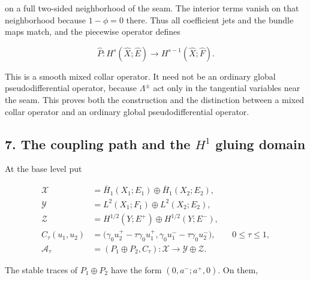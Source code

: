 \documentclass[
  11pt,
]{article}
\makeatletter
\let\ReaderOriginalAnchorStart\hyper@anchorstart
\let\ReaderOriginalAnchorEnd\hyper@anchorend
\let\ReaderPendingAliases\@empty
\def\ReaderArmAliases#1{\gdef\ReaderPendingAliases{#1}}
\def\hyper@anchorstart#1{\ReaderIfNativeAnchorTF{#1}{\ReaderPendingAliases\global\let\ReaderPendingAliases\@empty}{}\ReaderOriginalAnchorStart{#1}}
\makeatother
\begin{document}
on a full two-sided neighborhood of the seam. The interior terms vanish
on that neighborhood because \(1-\phi=0\) there. Thus all coefficient
jets and the bundle maps match, and the piecewise operator defines

\[
 \widehat P:H^s(\widehat X;\widehat E)
       \longrightarrow H^{s-1}(\widehat X;\widehat F).
 \tag{DI24}
\]

This is a smooth mixed collar operator. It need not be an ordinary
global pseudodifferential operator, because \(\Lambda^\pm\) act only in
the tangential variables near the seam. This proves both the
construction and the distinction between a mixed collar operator and an
ordinary global pseudodifferential operator.

\ReaderArmAliases{\ReaderOriginalAnchorStart{AN03-SDI-007}\ReaderOriginalAnchorEnd\begingroup\expandafter\def\csname @currentHref\endcsname{AN03-SDI-007}\label{AN03-SDI-007}\endgroup\ReaderOriginalAnchorStart{7-the-coupling-path-and-the-h-1-gluing-domain}\ReaderOriginalAnchorEnd\begingroup\expandafter\def\csname @currentHref\endcsname{7-the-coupling-path-and-the-h-1-gluing-domain}\label{7-the-coupling-path-and-the-h-1-gluing-domain}\endgroup\ReaderOriginalAnchorStart{the-coupling-path-and-the-h1-gluing-domain}\ReaderOriginalAnchorEnd}
\subsection{\texorpdfstring{7. The coupling path and the \(H^1\) gluing
domain}{7. The coupling path and the H\^{}1 gluing domain}}\label{the-coupling-path-and-the-h1-gluing-domain}

At the base level put

\[
 \begin{aligned}
 \mathcal X&=\bar H_1(X_1;E_1)\oplus\bar H_1(X_2;E_2),\\
 \mathcal Y&=L^2(X_1;F_1)\oplus L^2(X_2;E_2),\\
 \mathcal Z&=H^{1/2}(Y;E^+)\oplus H^{1/2}(Y;E^-),\\
 C_\tau(u_1,u_2)&=
 \bigl(\gamma_0u_2^+-\tau\gamma_0u_1^+,
       \gamma_0u_1^--\tau\gamma_0u_2^-\bigr),
       \qquad0\leq\tau\leq1,\\
 \mathcal A_\tau&=(P_1\oplus P_2,C_\tau):
              \mathcal X\longrightarrow\mathcal Y\oplus\mathcal Z.
 \end{aligned}
 \tag{DI25}
\]

The stable traces of \(P_1\oplus P_2\) have the form \((0,a^-;a^+,0)\).
On them,
\end{document}
